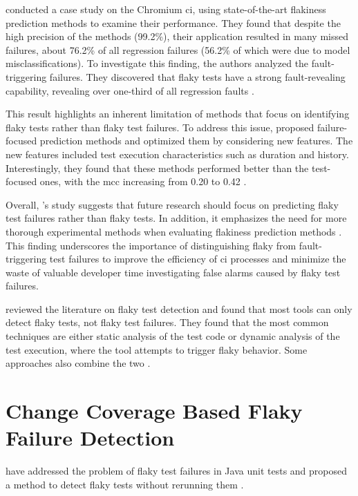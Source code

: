  conducted a case study on the Chromium \ac{ci}, using state-of-the-art flakiness prediction methods to examine their performance.
They found that despite the high precision of the methods (99.2\%), their application resulted in many missed failures, about 76.2\% of all regression failures (56.2\% of which were due to model misclassifications).
To investigate this finding, the authors analyzed the fault-triggering failures. They discovered that flaky tests have a strong fault-revealing capability, revealing over one-third of all regression faults \autocite{haben_importance_2023}.

This result highlights an inherent limitation of methods that focus on identifying flaky tests rather than flaky test failures.
To address this issue,  proposed failure-focused prediction methods and optimized them by considering new features.
The new features included test execution characteristics such as duration and history.
Interestingly, they found that these methods performed better than the test-focused ones, with the \ac{mcc} increasing from 0.20 to 0.42 \autocite{haben_importance_2023}.

Overall, \citeauthor*{haben_importance_2023}'s study suggests that future research should focus on predicting flaky test failures rather than flaky tests.
In addition, it emphasizes the need for more thorough experimental methods when evaluating flakiness prediction methods \autocite{haben_importance_2023}.
This finding underscores the importance of distinguishing flaky from fault-triggering test failures to improve the efficiency of \ac{ci} processes and minimize the waste of valuable developer time investigating false alarms caused by flaky test failures.

 reviewed the literature on flaky test detection and found that most tools can only detect flaky tests, not flaky test failures.
They found that the most common techniques are either static analysis of the test code or dynamic analysis of the test execution, where the tool attempts to trigger flaky behavior.
Some approaches also combine the two \autocite{rasheed_test_2022}.
\section{Change Coverage Based Flaky Failure Detection}

 have addressed the problem of flaky test failures in Java unit tests and proposed a method to detect flaky tests without rerunning them \autocite{bell_deflaker_2018}.

